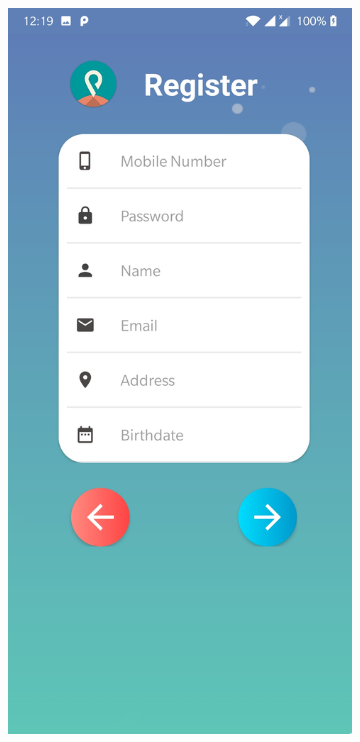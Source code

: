 \documentclass[12pt, english]{article}
\begin{document}
\begin{figure}[h!]
    \centering
    \begin{subfigure}[t]{0.4\textwidth}
    \includegraphics[width=\linewidth]{Account_Creation/CreateAccountActivity.jpg}

\end{subfigure}
\end{figure}
\end{document}

